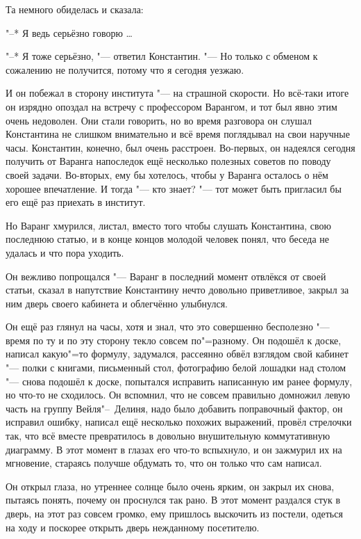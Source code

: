 Та немного обиделась и сказала:

"--* Я ведь серьёзно говорю \ldots

"--* Я тоже серьёзно, "--- ответил Константин.
"--- Но только с обменом к сожалению не получится, потому что я сегодня уезжаю.

И он побежал в сторону института "--- на страшной скорости.
Но всё-таки итоге он изрядно опоздал на встречу с профессором Варангом, и тот
был явно этим очень недоволен.
Они стали говорить, но во время разговора он слушал Константина не слишком
внимательно и всё время поглядывал на свои наручные часы.
Константин, конечно, был очень расстроен.
Во-первых, он надеялся сегодня получить от Варанга напоследок ещё несколько
полезных советов по поводу своей задачи.
Во-вторых, ему бы хотелось, чтобы у Варанга осталось о нём хорошее впечатление.
И тогда "--- кто знает? "--- тот может быть пригласил бы его ещё раз приехать в
институт.

Но Варанг хмурился, листал, вместо того чтобы слушать Константина, свою
последнюю статью, и в конце концов молодой человек понял, что беседа не удалась
и что пора уходить.

Он вежливо попрощался "--- Варанг в последний момент отвлёкся от своей статьи,
сказал в напутствие Константину нечто довольно приветливое, закрыл за ним дверь
своего кабинета и облегчённо улыбнулся.

Он ещё раз глянул на часы, хотя и знал, что это совершенно бесполезно "--- время
по ту и по эту сторону текло совсем по"=разному.
Он подошёл к доске, написал какую"=то формулу, задумался, рассеянно обвёл
взглядом свой кабинет "--- полки с книгами, письменный стол, фотографию белой
лошадки над столом "--- снова подошёл к доске, попытался исправить написанную
им ранее формулу, но что-то не сходилось.
Он вспомнил, что не совсем правильно домножил левую часть на группу
Вейля"--~Делиня, надо было добавить поправочный фактор, он исправил ошибку,
написал ещё несколько похожих выражений, провёл стрелочки так, что всё вместе
превратилось в довольно внушительную коммутативную диаграмму.
В этот момент в глазах его что-то вспыхнуло, и он зажмурил их на мгновение,
стараясь получше обдумать то, что он только что сам написал.

Он открыл глаза, но утреннее солнце было очень ярким, он закрыл их снова,
пытаясь понять, почему он проснулся так рано.
В этот момент раздался стук в дверь, на этот раз совсем громко, ему пришлось
выскочить из постели, одеться на ходу и поскорее открыть дверь нежданному
посетителю.

